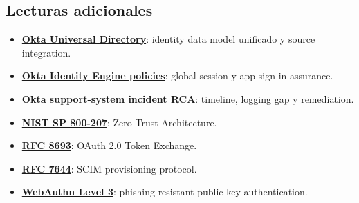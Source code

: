\documentclass[a4paper]{article}
\begin{document}
\subsection{Lecturas adicionales}

{\small
\begin{itemize}[nosep,leftmargin=*]
  \item \href{https://developer.okta.com/docs/concepts/universal-directory/}{\textbf{Okta Universal Directory}}: identity data model unificado y source integration.
  \item \href{https://help.okta.com/oie/en-us/content/topics/identity-engine/policies/about-policies.htm}{\textbf{Okta Identity Engine policies}}: global session y app sign-in assurance.
  \item \href{https://sec.okta.com/articles/2023/11/unauthorized-access-oktas-support-case-management-system-root-cause/}{\textbf{Okta support-system incident RCA}}: timeline, logging gap y remediation.
  \item \href{https://csrc.nist.gov/pubs/sp/800/207/final}{\textbf{NIST SP 800-207}}: Zero Trust Architecture.
  \item \href{https://www.rfc-editor.org/rfc/rfc8693}{\textbf{RFC 8693}}: OAuth 2.0 Token Exchange.
  \item \href{https://www.rfc-editor.org/rfc/rfc7644}{\textbf{RFC 7644}}: SCIM provisioning protocol.
  \item \href{https://www.w3.org/TR/webauthn-3/}{\textbf{WebAuthn Level 3}}: phishing-resistant public-key authentication.
\end{itemize}
}
\end{document}
